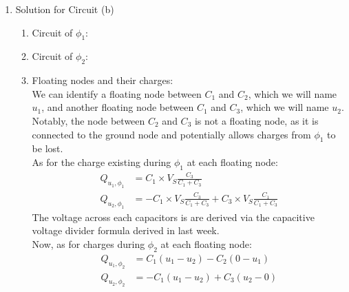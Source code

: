 {\begin{enumerate}
{\begin{enumerate}
{                }
            \end{enumerate}
        }
        \item {
            Solution for Circuit (b) \\
            \begin{center}
                
            \end{center}
            \begin{enumerate}
                \item[1.] {
                    Circuit of $\phi_1$:
                    \begin{center}
                        
                    \end{center}
                }
                \item[2.] {
                    Circuit of $\phi_2$:
                    \begin{center}
                        
                    \end{center}
                }
                \item[3.] {
                    Floating nodes and their charges: \\
                    We can identify a floating node between $C_1$ and $C_2$, which we will name $u_1$, and another floating node between $C_1$ and $C_3$, which we will name $u_2$. \\
                    Notably, the node between $C_2$ and $C_3$ is not a floating node, as it is connected to the ground node and potentially allows charges from $\phi_1$ to be lost. \\
                    As for the charge existing during $\phi_1$ at each floating node:
                    \begin{align*}
                        Q_{u_1, \phi_1} &= C_1 \times V_S \frac{C_3}{C_1 + C_3} \\
                        Q_{u_2, \phi_1} &= - C_1 \times V_S \frac{C_3}{C_1 + C_3} + C_3 \times V_S \frac{C_1}{C_1 + C_3}
                    \end{align*}
                    The voltage across each capacitors is are derived via the capacitive voltage divider formula derived in last week. \\
                    Now, as for charges during $\phi_2$ at each floating node:
                    \begin{align*}
                        Q_{u_1, \phi_2} &= C_1 (u_1 - u_2) - C_2 (0 - u_1) \\
                        Q_{u_2, \phi_2} &= -C_1 (u_1 - u_2) + C_3 (u_2 - 0)
                    \end{align*}
                    
}
\end{enumerate}}
\end{enumerate}}
